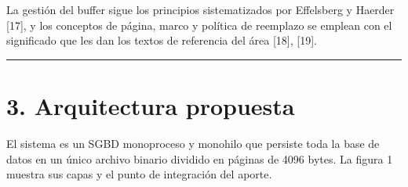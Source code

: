 \documentclass[11pt,a4paper]{article}
\let\subsection\section
\begin{document}
La gestión del buffer sigue los principios sistematizados por Effelsberg
y Haerder {[}17{]}, y los conceptos de página, marco y política de
reemplazo se emplean con el significado que les dan los textos de
referencia del área {[}18{]}, {[}19{]}.

\begin{center}\rule{0.5\linewidth}{0.5pt}\end{center}

\subsection{3. Arquitectura propuesta}\label{3-arquitectura-propuesta}

El sistema es un SGBD monoproceso y monohilo que persiste toda la base
de datos en un único archivo binario dividido en páginas de 4096 bytes.
La figura 1 muestra sus capas y el punto de integración del aporte.
\end{document}
